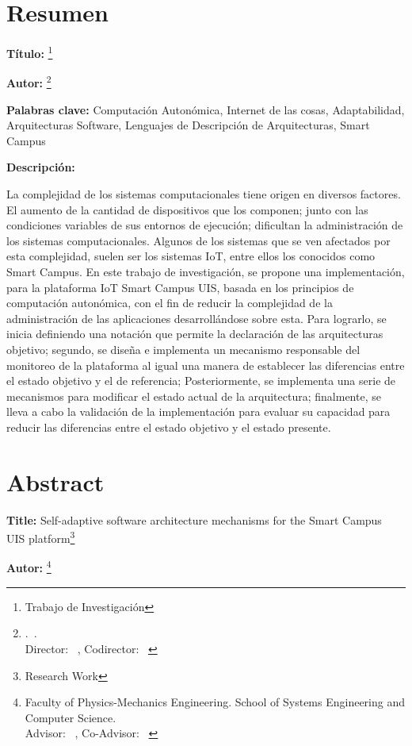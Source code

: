 \section*{Resumen}

\textbf{Título:} \tit\footnote{Trabajo de Investigación}

\textbf{Autor:} \nam\footnote{\fac.\ \esc.\\ Director: \tdir\ \dir, Codirector: \tcdir\ \cdir }

\textbf{Palabras clave:} { Computación Autonómica, Internet de las cosas, Adaptabilidad, \\Arquitecturas Software, Lenguajes de Descripción de Arquitecturas, Smart Campus }

\textbf{Descripción:}

La complejidad de los sistemas computacionales tiene origen en diversos factores. El aumento de la cantidad de dispositivos que los componen; junto con las condiciones variables de sus entornos de ejecución; dificultan la administración de los sistemas computacionales. Algunos de los sistemas que se ven afectados por esta complejidad, suelen ser los sistemas IoT, entre ellos los conocidos como Smart Campus. En este trabajo de investigación, se propone una implementación, para la plataforma IoT Smart Campus UIS, basada en los principios de computación autonómica, con el fin de reducir la complejidad de la administración de las aplicaciones desarrollándose sobre esta. Para lograrlo, se inicia definiendo una notación que permite la declaración de las arquitecturas objetivo; segundo, se diseña e implementa un mecanismo responsable del monitoreo de la plataforma al igual una manera de establecer las diferencias entre el estado objetivo y el de referencia; Posteriormente, se implementa una serie de mecanismos para modificar el estado actual de la arquitectura; finalmente, se lleva a cabo la validación de la implementación para evaluar su capacidad para reducir las diferencias entre el estado objetivo y el estado presente.

\newpage

\section*{Abstract}

\textbf{Title:} {Self-adaptive software architecture mechanisms for the Smart Campus\\UIS platform}\footnote{Research Work}

\textbf{Autor:} \nam\footnote{Faculty of Physics-Mechanics Engineering. School of Systems Engineering and Computer
Science.\\ Advisor: \tdir\ \dir, Co-Advisor: \tcdir\ \cdir }

